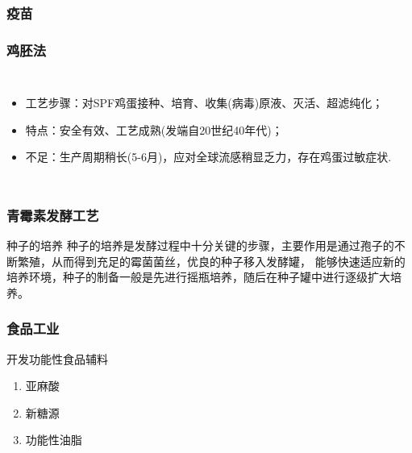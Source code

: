 \documentclass[10pt,aspectratio=43,mathserif]{beamer}
\begin{document}
 \begin{frame}
\frametitle{\textbf{疫苗}}
\end{frame}

\begin{frame}
\frametitle{鸡胚法}
\begin{columns}[c]
\begin{itemize}
    \item 工艺步骤：对SPF鸡蛋接种、培育、收集(病毒)原液、灭活、超滤纯化；
    \item 特点：安全有效、工艺成熟(发端自20世纪40年代)；
    \item 不足：生产周期稍长(5-6月)，应对全球流感稍显乏力，存在鸡蛋过敏症状.
\end{itemize}
\end{columns}
\end{frame}


    \begin{frame}
    \frametitle{\textbf{青霉素发酵工艺}}
        \begin{block}{种子的培养}
            种子的培养是发酵过程中十分关键的步骤，主要作用是通过孢子的不断繁殖，从而得到充足的霉菌菌丝，优良的种子移入发酵罐，
            能够快速适应新的培养环境，种子的制备一般是先进行摇瓶培养，随后在种子罐中进行逐级扩大培养。
        \end{block}
    \end{frame}

       \begin{frame}
        \frametitle{食品工业}
        \begin{block}{开发功能性食品辅料}
            \begin{enumerate}
                \item 亚麻酸
                \item 新糖源
                \item 功能性油脂
            \end{enumerate}
        \end{block}
        \end{frame}
\end{document}
